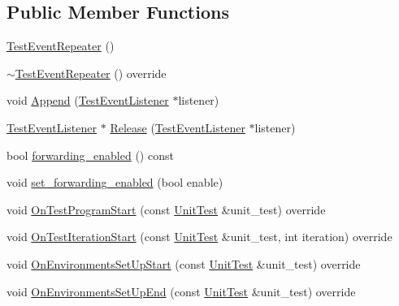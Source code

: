 \subsection*{Public Member Functions}
\begin{DoxyCompactItemize}
\item 
\mbox{\hyperlink{classtesting_1_1internal_1_1_test_event_repeater_a97dc3b08bd62c615f16e4c73ed0b3894}{Test\+Event\+Repeater}} ()
\item 
\mbox{\hyperlink{classtesting_1_1internal_1_1_test_event_repeater_a8cf2d21be2b131177b5926b9e04f0f98}{$\sim$\+Test\+Event\+Repeater}} () override
\item 
void \mbox{\hyperlink{classtesting_1_1internal_1_1_test_event_repeater_ad154ce021881721a5c46994316b14cb1}{Append}} (\mbox{\hyperlink{classtesting_1_1_test_event_listener}{Test\+Event\+Listener}} $\ast$listener)
\item 
\mbox{\hyperlink{classtesting_1_1_test_event_listener}{Test\+Event\+Listener}} $\ast$ \mbox{\hyperlink{classtesting_1_1internal_1_1_test_event_repeater_ac77a3d127e4726e11694e4ee9cf3b793}{Release}} (\mbox{\hyperlink{classtesting_1_1_test_event_listener}{Test\+Event\+Listener}} $\ast$listener)
\item 
bool \mbox{\hyperlink{classtesting_1_1internal_1_1_test_event_repeater_abaf2bfc453fc0e1005fcfb0f95deac4c}{forwarding\+\_\+enabled}} () const
\item 
void \mbox{\hyperlink{classtesting_1_1internal_1_1_test_event_repeater_a86c52e311b70598a385a0589277e92e0}{set\+\_\+forwarding\+\_\+enabled}} (bool enable)
\item 
void \mbox{\hyperlink{classtesting_1_1internal_1_1_test_event_repeater_abe19a6eed2548e9c768ae2d156f1f593}{On\+Test\+Program\+Start}} (const \mbox{\hyperlink{classtesting_1_1_unit_test}{Unit\+Test}} \&unit\+\_\+test) override
\item 
void \mbox{\hyperlink{classtesting_1_1internal_1_1_test_event_repeater_a98fea6c94833db424e083eff337ef370}{On\+Test\+Iteration\+Start}} (const \mbox{\hyperlink{classtesting_1_1_unit_test}{Unit\+Test}} \&unit\+\_\+test, int iteration) override
\item 
void \mbox{\hyperlink{classtesting_1_1internal_1_1_test_event_repeater_a739b5fd1f5bcb96b42089ff06281b3ea}{On\+Environments\+Set\+Up\+Start}} (const \mbox{\hyperlink{classtesting_1_1_unit_test}{Unit\+Test}} \&unit\+\_\+test) override
\item 
void \mbox{\hyperlink{classtesting_1_1internal_1_1_test_event_repeater_a744eeb6ddfcba78b34515fac7f1ab704}{On\+Environments\+Set\+Up\+End}} (const \mbox{\hyperlink{classtesting_1_1_unit_test}{Unit\+Test}} \&unit\+\_\+test) override

\end{DoxyCompactItemize}
